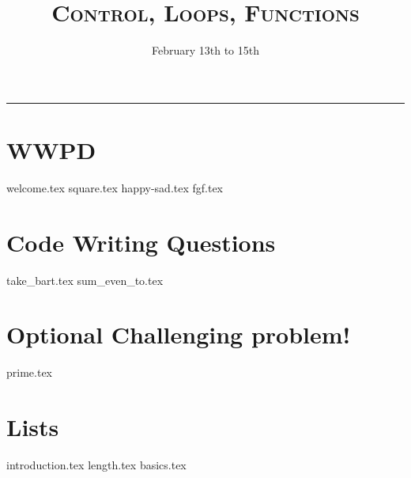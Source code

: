 \documentclass{exam}
\title{\textsc{Control, Loops, Functions}}
\date{February 13th to 15th}
\begin{document}
\maketitle
\rule{\textwidth}{0.15em}
\fontsize{12}{15}\selectfont


\section{WWPD}
\begin{questions}
{welcome.tex}
\vspace{5em}
{square.tex}
\newpage
{happy-sad.tex}
\vspace{5em}
{fgf.tex}
\end{questions}

\newpage
\section{Code Writing Questions}
\begin{questions}
{take_bart.tex}
{sum_even_to.tex}
\newpage
\section{Optional Challenging problem!}
{prime.tex}
\newpage
\section{Lists}
{introduction.tex}
{length.tex}
\newpage
{basics.tex}

\end{questions}
\end{document}
